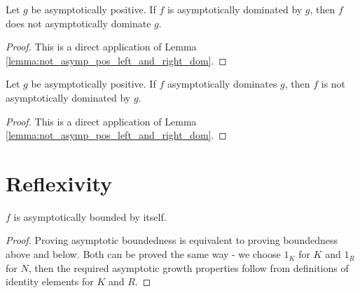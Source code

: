 \begin{theorem}
    \label{thm:not_asymp_pos_left_dom_of_right_dom}
    \leanok
    Let $g$ be asymptotically positive. If $f$ is asymptotically dominated by $g$, then
    $f$ does not asymptotically dominate $g$.
\end{theorem}

\begin{proof}
    \leanok
    This is a direct application of Lemma \ref{lemma:not_asymp_pos_left_and_right_dom}. 
\end{proof}

\begin{theorem}
    \label{thm:not_asymp_pos_right_dom_of_left_dom}
    \leanok
    Let $g$ be asymptotically positive. If $f$ asymptotically dominates $g$, then
    $f$ is not asymptotically dominated by $g$.
\end{theorem}

\begin{proof}
    \leanok
    This is a direct application of Lemma \ref{lemma:not_asymp_pos_left_and_right_dom}. 
\end{proof}


\section{Reflexivity}

\begin{lemma}
    \label{lemma:asymp_bounded_refl}
    \leanok
    $f$ is asymptotically bounded by itself. 

\end{lemma}

\begin{proof}
    \leanok
    Proving asymptotic boundedness is equivalent to proving boundedness above and below.
    Both can be proved the same way - we choose $1_K$ for $K$ and $1_R$ for $N$, then the
    required asymptotic growth properties follow from definitions of identity elements for 
    $K$ and $R$.
\end{proof}

